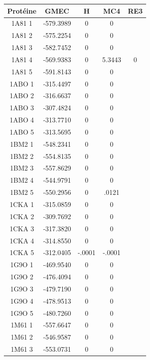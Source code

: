 \documentclass[a4paper,12pt]{article}
\begin{document}
    \begin{table}[h]
      \centering

      \begin{tabular}{|c|c|c|c|c|}


        \hline
        \hline
        Protéine & GMEC & H & MC4 & RE3 \\
        \hline
        1A81 1 & -579.3989 & 0 & 0 &  \\
        1A81 2 & -575.2254 & 0 & 0 &  \\
        1A81 3 & -582.7452 & 0 & 0 &  \\
        1A81 4 & -569.9383 & 0 & 5.3443 & 0 \\
        1A81 5 & -591.8143 & 0 & 0 &  \\
        1ABO 1 & -315.4497 & 0 & 0 &  \\
        1ABO 2 & -316.6637 & 0 & 0 &  \\
        1ABO 3 & -307.4824 & 0 & 0 &  \\
        1ABO 4 & -313.7710 & 0 & 0 &  \\
        1ABO 5 & -313.5695 & 0 & 0 &  \\
        1BM2 1 & -548.2341 & 0 & 0 &  \\
        1BM2 2 & -554.8135 & 0 & 0 &  \\
        1BM2 3 & -557.8629 & 0 & 0 &  \\
        1BM2 4 & -544.9791 & 0 & 0 &  \\
        1BM2 5 & -550.2956 & 0 & .0121 &  \\
        1CKA 1 & -315.0859 & 0 & 0 &  \\
        1CKA 2 & -309.7692 & 0 & 0 &  \\
        1CKA 3 & -317.3820 & 0 & 0 &  \\
        1CKA 4 & -314.8550 & 0 & 0 &  \\
        1CKA 5 & -312.0405 & -.0001 & -.0001 &  \\
        1G9O 1 & -469.9540 & 0 & 0 &  \\
        1G9O 2 & -476.4094 & 0 & 0 &  \\
        1G9O 3 & -479.7190 & 0 & 0 &  \\
        1G9O 4 & -478.9513 & 0 & 0 &  \\
        1G9O 5 & -480.7260 & 0 & 0 &  \\
        1M61 1 & -557.6647 & 0 & 0 &  \\
        1M61 2 & -546.9587 & 0 & 0 &  \\
        1M61 3 & -553.0731 & 0 & 0 &  \\

\end{tabular}
\end{table}
\end{document}
